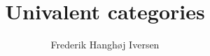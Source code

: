 \documentclass{article}
\title{Univalent categories}
\author{Frederik Hanghøj Iversen}
\begin{document}
\maketitle




\nocite{cubical-demo}
\nocite{coquand-2013}

\begin{appendices}


\end{appendices}
\end{document}
